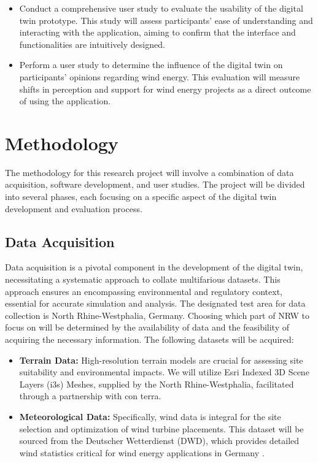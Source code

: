 \documentclass[11pt, titlepage, a4paper]{scrartcl}
\begin{document}
\begin{linenumbers}
\begin{itemize}[label={--}]
        \item Conduct a comprehensive user study to evaluate the usability of the digital twin prototype. This study will assess participants' ease of understanding and interacting with the application, aiming to confirm that the interface and functionalities are intuitively designed.
        \item Perform a user study to determine the influence of the digital twin on participants' opinions regarding wind energy. This evaluation will measure shifts in perception and support for wind energy projects as a direct outcome of using the application.
    \end{itemize}


    \section{Methodology}
    The methodology for this research project will involve a combination of data acquisition, software development, and user studies. The project will be divided into several phases, each focusing on a specific aspect of the digital twin development and evaluation process.

    \subsection{Data Acquisition}
    Data acquisition is a pivotal component in the development of the digital twin, necessitating a systematic approach to collate multifarious datasets. This approach ensures an encompassing environmental and regulatory context, essential for accurate simulation and analysis. The designated test area for data collection is North Rhine-Westphalia, Germany. Choosing which part of NRW to focus on will be determined by the availability of data and the feasibility of acquiring the necessary information.
    The following datasets will be acquired:

    \begin{itemize}
        \item \textbf{Terrain Data:} High-resolution terrain models are crucial for assessing site suitability and environmental impacts. We will utilize Esri Indexed 3D Scene Layers (i3s) Meshes, supplied by the North Rhine-Westphalia, facilitated through a partnership with con terra.

        \item \textbf{Meteorological Data:} Specifically, wind data is integral for the site selection and optimization of wind turbine placements. This dataset will be sourced from the Deutscher Wetterdienst (DWD), which provides detailed wind statistics critical for wind energy applications in Germany \cite{deutscherwetterdienstWinddatenFurWindenergienutzer}.


\end{itemize}
\end{linenumbers}
\end{document}
